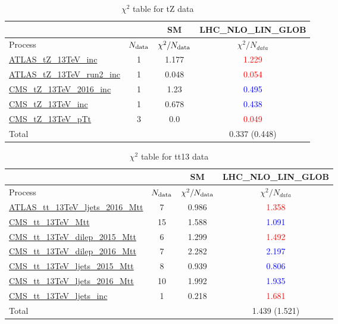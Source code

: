 \documentclass{article}
\begin{document}
\begin{table}[H]
\centering
\begin{tabular}{|l|c|c|c|}
\hline
 \multicolumn{2}{|c|}{} & SM& LHC_NLO_LIN_GLOB\\ \hline
Process & $N_{\rm data}$ & $\chi^ 2/N_{\rm data}$& $\chi^ 2/N_{data}$\\ \hline
\href{https://arxiv.org}{ATLAS_tZ_13TeV_inc} & 1 & 1.177 & \textcolor{red}                            {1.229} \\ \hline
\href{https://arxiv.org}{ATLAS_tZ_13TeV_run2_inc} & 1 & 0.048 & \textcolor{red}                            {0.054} \\ \hline
\href{https://arxiv.org}{CMS_tZ_13TeV_2016_inc} & 1 & 1.23 & \textcolor{blue}                            {0.495} \\ \hline
\href{https://arxiv.org}{CMS_tZ_13TeV_inc} & 1 & 0.678 & \textcolor{blue}                            {0.438} \\ \hline
\href{https://arxiv.org}{CMS_tZ_13TeV_pTt} & 3 & 0.0 & \textcolor{red}                            {0.049} \\ \hline
\hline Total & &  & 0.337 (0.448) \\ \hline
\end{tabular}
\caption{$\chi^2$ table for tZ data}
\end{table}
\begin{table}[H]
\centering
\begin{tabular}{|l|c|c|c|}
\hline
 \multicolumn{2}{|c|}{} & SM& LHC_NLO_LIN_GLOB\\ \hline
Process & $N_{\rm data}$ & $\chi^ 2/N_{\rm data}$& $\chi^ 2/N_{data}$\\ \hline
\href{https://arxiv.org}{ATLAS_tt_13TeV_ljets_2016_Mtt} & 7 & 0.986 & \textcolor{red}                            {1.358} \\ \hline
\href{https://arxiv.org}{CMS_tt_13TeV_Mtt} & 15 & 1.588 & \textcolor{blue}                            {1.091} \\ \hline
\href{https://arxiv.org}{CMS_tt_13TeV_dilep_2015_Mtt} & 6 & 1.299 & \textcolor{red}                            {1.492} \\ \hline
\href{https://arxiv.org}{CMS_tt_13TeV_dilep_2016_Mtt} & 7 & 2.282 & \textcolor{blue}                            {2.197} \\ \hline
\href{https://arxiv.org}{CMS_tt_13TeV_ljets_2015_Mtt} & 8 & 0.939 & \textcolor{blue}                            {0.806} \\ \hline
\href{https://arxiv.org}{CMS_tt_13TeV_ljets_2016_Mtt} & 10 & 1.992 & \textcolor{blue}                            {1.935} \\ \hline
\href{https://arxiv.org}{CMS_tt_13TeV_ljets_inc} & 1 & 0.218 & \textcolor{red}                            {1.681} \\ \hline
\hline Total & &  & 1.439 (1.521) \\ \hline
\end{tabular}
\caption{$\chi^2$ table for tt13 data}
\end{table}
\end{document}
